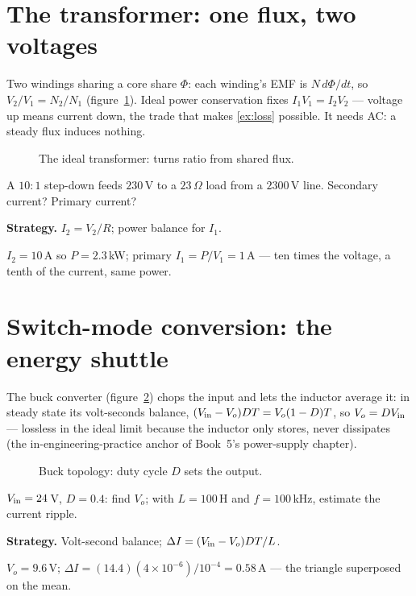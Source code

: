 \section{The transformer: one flux, two voltages}\label{sec:pw-xfmr}

Two windings sharing a core share $\Phi$: each winding's EMF is
$N\,d\Phi/dt$, so $V_2/V_1=N_2/N_1$ (figure~\ref{fig:xfmr}). Ideal
power conservation fixes $I_1V_1=I_2V_2$ --- voltage up means current
down, the trade that makes \ref{ex:loss} possible. It needs AC: a
steady flux induces nothing.

\begin{figure}[htbp]\centering

\caption{The ideal transformer: turns ratio from shared flux.}
\label{fig:xfmr}
\end{figure}

\begin{example}\label{ex:xfmr}
A $10{:}1$ step-down feeds $230$\,V to a $23\,\Omega$ load from a
$2300$\,V line. Secondary current? Primary current?
\par\smallskip
\textbf{Strategy.} $I_2=V_2/R$; power balance for $I_1$.
\begin{solution}
$I_2=10$\,A so $P=2.3$\,kW; primary $I_1=P/V_1=1$\,A --- ten times
the voltage, a tenth of the current, same power. \checkmark
\end{solution}
\end{example}

\section{Switch-mode conversion: the energy shuttle}\label{sec:pw-buck}

The buck converter (figure~\ref{fig:buck}) chops the input and lets the
inductor average it: in steady state its volt-seconds balance,
$(V_{\rm in}-V_o)DT=V_o(1-D)T$, so $V_o=DV_{\rm in}$ --- lossless in
the ideal limit because the inductor only stores, never dissipates
(the in-engineering-practice anchor of Book~5's power-supply chapter).

\begin{figure}[htbp]\centering

\caption{Buck topology: duty cycle $D$ sets the output.}
\label{fig:buck}
\end{figure}

\begin{example}\label{ex:buck}
$V_{\rm in}=24$\,V, $D=0.4$: find $V_o$; with $L=100$\,\textmu H and
$f=100$\,kHz, estimate the current ripple.
\par\smallskip
\textbf{Strategy.} Volt-second balance; $\Delta I=(V_{\rm in}-V_o)DT/L$.
\begin{solution}
$V_o=9.6$\,V; $\Delta I=(14.4)(4\times10^{-6})/10^{-4}=0.58$\,A ---
the triangle superposed on the mean. \checkmark
\end{solution}
\end{example}

